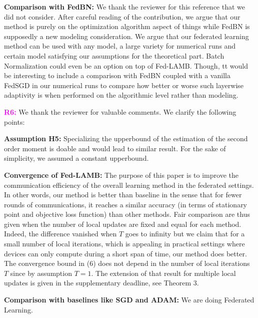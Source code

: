 \documentclass{article}
\begin{document}
\vspace{-2pt}
\textbf{Comparison with FedBN:} We thank the reviewer for this reference that we did not consider.
After careful reading of the contribution, we argue that our method is purely on the optimization algorithm aspect of things while FedBN is supposedly a new modeling consideration.
We argue that our federated learning method can be used with any model, a large variety for numerical runs and certain model satisfying our assumptions for the theoretical part. 
Batch Normalization could even be an option on top of Fed-LAMB.
Though, tt would be interesting to include a comparison with FedBN coupled with a vanilla FedSGD in our numerical runs to compare how better or worse such layerwise adaptivity is when performed on the algorithmic level rather than modeling.

\textbf{\textcolor{magenta}{R6:}} We thank the reviewer for valuable comments. We clarify the following points: \vspace{-5pt}


\textbf{Assumption H5:} Specializing the upperbound of the estimation of the second order moment is doable and would lead to similar result. For the sake of simplicity, we assumed a constant upperbound.

\vspace{-2pt}
\textbf{Convergence of Fed-LAMB:} The purpose of this paper is to improve the communication efficiency of the overall learning method in the federated settings.
In other words, our method is better than baseline in the sense that for fewer rounds of communications, it reaches a similar accuracy (in terms of stationary point and objective loss function) than other methods.
Fair comparison are thus given when the number of local updates are fixed and equal for each method. Indeed, the difference vanished when $T$ goes to infinity but we claim that for a small number of local iterations, which is appealing in practical settings where devices can only compute during a short span of time, our method does better.
The convergence bound in (6) does not depend in the number of local iterations $T$ since by assumption $T=1$.
The extension of that result for multiple local updates is given in the supplementary deadline, see Theorem 3.

\vspace{-2pt}
\textbf{Comparison with baselines like SGD and ADAM:}  We are doing Federated Learning.
\end{document}
